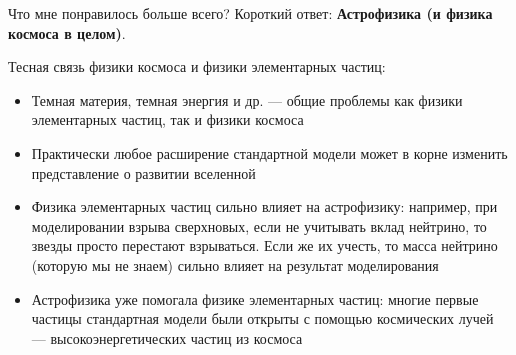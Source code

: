 \documentclass[hyperref={colorlinks,citecolor=blue,linkcolor=blue,urlcolor=blue}]{beamer}
\begin{document}
\begin{frame}{Что мне понравилось больше всего?}
    Короткий ответ: \textbf{Астрофизика (и физика космоса в целом)}.

    Тесная связь физики космоса и физики элементарных частиц:
    \begin{itemize}
        \item Темная материя, темная энергия и др. --- общие проблемы как физики элементарных частиц, так и физики космоса
        \item Практически любое расширение стандартной модели может в корне изменить представление о развитии вселенной
        \item Физика элементарных частиц сильно влияет на астрофизику: например, при моделировании взрыва сверхновых, если не учитывать вклад нейтрино, то звезды просто перестают взрываться. Если же их учесть, то масса нейтрино (которую мы не знаем) сильно влияет на результат моделирования
        \item Астрофизика уже помогала физике элементарных частиц: многие первые частицы стандартная модели были открыты с помощью космических лучей --- высокоэнергетических частиц из космоса
    \end{itemize}
\end{frame}
\end{document}
